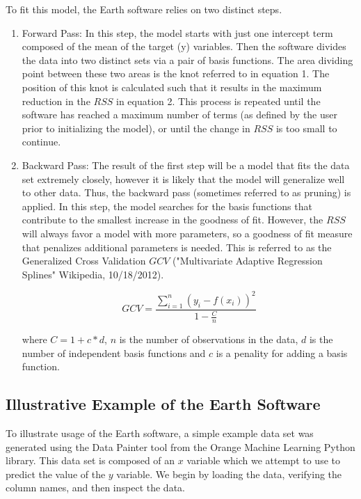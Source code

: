 To fit this model, the Earth software relies on two distinct steps.
\begin{enumerate}


\item Forward Pass: In this step, the model starts with just one intercept term composed of the mean of the target (y) variables. Then the software divides the data into two distinct sets via a pair of basis functions. The area dividing point between these two areas is the knot referred to in equation 1. The position of this knot is calculated such that it results in the maximum reduction in the $RSS$ in equation 2. This process is repeated until the software has reached a maximum number of terms (as defined by the user prior to initializing the model), or until the change in $RSS$ is too small to continue.

\item Backward Pass: The result of the first step will be a model that fits the data set extremely closely, however it is likely that the model will generalize well to other data. Thus, the backward pass (sometimes referred to as pruning) is applied. In this step, the model searches for the basis functions that contribute to the smallest increase in the goodness of fit. However, the $RSS$ will always favor a model with more parameters, so a goodness of fit measure that penalizes additional parameters is needed. This is referred to as the Generalized Cross Validation $GCV$ ("Multivariate Adaptive Regression Splines" Wikipedia, 10/18/2012).



\begin{equation}
GCV=\frac{\sum_{i=1}^{n} (y_{i}-f(x_{i}))^{2}}{1-\frac{C}{n}}
\end{equation}

where $C=1+c*d$, $n$ is the number of observations in the data, $d$ is the number of independent basis functions and $c$ is a penality for adding a basis function.
 
\end{enumerate}




\subsection{Illustrative Example of the Earth Software} %

To illustrate usage of the Earth software, a simple example data set was generated using the Data Painter tool from the Orange Machine Learning Python library. This data set is composed of an $x$ variable which we attempt to use to predict the value of the $y$ variable. We begin by loading the data, verifying the column names, and then inspect the data.

